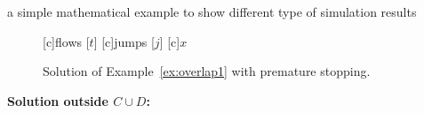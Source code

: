 \begin{example}{a simple mathematical example to show different type of simulation results}
\begin{figure}[ht]
  \centering
  [c]{flows [$t$]}
  [c]{jumps [$j$]}
  [c]{$x$}
\qquad
{}
\caption{Solution of Example~\ref{ex:overlap1} with premature stopping.}
\end{figure}

%


{\bf Solution outside $C\cup D$:}
\\


\end{example}

